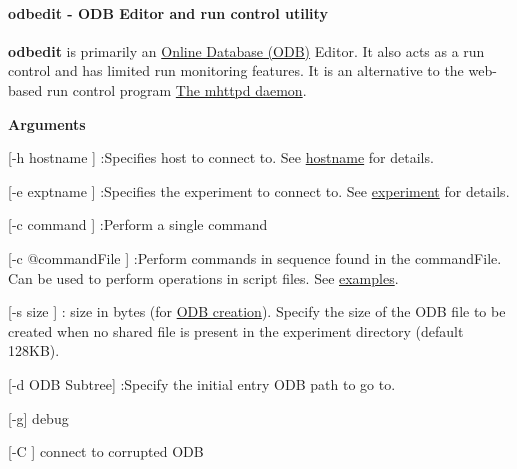 \paragraph{odbedit -\/ ODB Editor and run control utility}\label{RC_odbedit_utility}
\label{RC_odbedit_utility_idx_odbedit-utility}
\hypertarget{RC_odbedit_utility_idx_odbedit-utility}{}
 \par
 

\par


\label{RC_odbedit_utility_idx_edit_ODB_using-odbedit}
\hypertarget{RC_odbedit_utility_idx_edit_ODB_using-odbedit}{}
 {\bfseries odbedit} is primarily an \hyperlink{F_MainElements_F_Online_Database_overview}{Online Database (ODB)} Editor. It also acts as a run control and has limited run monitoring features. It is an alternative to the web-\/based run control program \hyperlink{RC_mhttpd_utility}{The mhttpd daemon}.


\begin{DoxyItemize}
\item {\bfseries  Arguments }
\begin{DoxyItemize}
\item \mbox{[}-\/h hostname \mbox{]} :Specifies host to connect to. See \hyperlink{F_Utilities_List_F_utilities_params}{hostname} for details.
\item \mbox{[}-\/e exptname \mbox{]} :Specifies the experiment to connect to. See \hyperlink{F_Utilities_List_F_utilities_params}{experiment} for details.
\item \mbox{[}-\/c command \mbox{]} :Perform a single command
\item \mbox{[}-\/c @commandFile \mbox{]} :Perform commands in sequence found in the commandFile. Can be used to perform operations in script files. See \hyperlink{RC_odbedit_examples_RC_odbedit_extcommand}{examples}.
\item \mbox{[}-\/s size \mbox{]} : size in bytes (for \hyperlink{RC_odbedit_examples_RC_odbedit_create_ODB}{ODB creation}). Specify the size of the ODB file to be created when no shared file is present in the experiment directory (default 128KB).
\item \mbox{[}-\/d ODB Subtree\mbox{]} :Specify the initial entry ODB path to go to.
\item \mbox{[}-\/g\mbox{]} debug
\item \mbox{[}-\/C \mbox{]} connect to corrupted ODB
\end{DoxyItemize}
\end{DoxyItemize}


